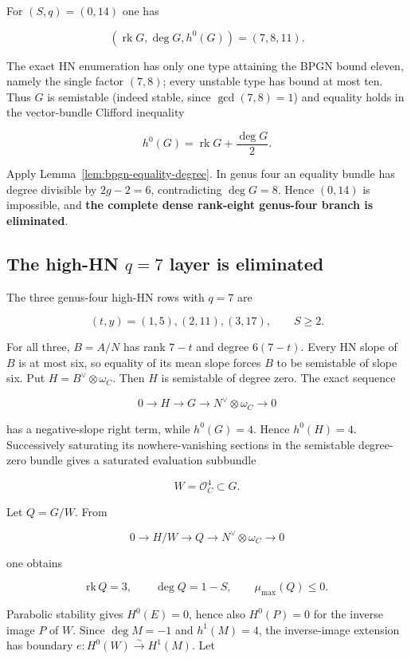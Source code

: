 \documentclass[11pt]{article}
\theoremstyle{definition}
\begin{document}
For \((S,q)=(0,14)\) one has

\[(\operatorname{rk}G,\deg G,h^0(G))=(7,8,11).\]

The exact HN enumeration has only one type attaining the BPGN bound
eleven, namely the single factor \((7,8)\); every unstable type has
bound at most ten. Thus \(G\) is semistable (indeed stable, since
\(\gcd(7,8)=1\)) and equality holds in the vector-bundle Clifford
inequality

\[h^0(G)=\operatorname{rk}G+\frac{\deg G}{2}.\]

Apply Lemma~\ref{lem:bpgn-equality-degree}.  In genus four an equality bundle
has degree divisible by \(2g-2=6\), contradicting \(\deg G=8\). Hence
\((0,14)\) is impossible, and \textbf{the complete dense rank-eight
genus-four branch is eliminated}.

\subsection{\texorpdfstring{The high-HN \(q=7\) layer is
eliminated}{The high-HN q=7 layer is eliminated}}\label{the-high-hn-q7-layer-is-eliminated}

The three genus-four high-HN rows with \(q=7\) are

\[(t,y)=(1,5),(2,11),(3,17),\qquad S\ge2.\]

For all three, \(B=A/N\) has rank \(7-t\) and degree \(6(7-t)\). Every
HN slope of \(B\) is at most six, so equality of its mean slope forces
\(B\) to be semistable of slope six. Put \(H=B^\vee\otimes\omega_C\).
Then \(H\) is semistable of degree zero. The exact sequence

\[0\longrightarrow H\longrightarrow G
\longrightarrow N^\vee\otimes\omega_C\longrightarrow0\]

has a negative-slope right term, while \(h^0(G)=4\). Hence \(h^0(H)=4\).
Successively saturating its nowhere-vanishing sections in the semistable
degree-zero bundle gives a saturated evaluation subbundle

\[W=\mathcal O_C^4\subset G.\]

Let \(Q=G/W\). From

\[0\longrightarrow H/W\longrightarrow Q
\longrightarrow N^\vee\otimes\omega_C\longrightarrow0\]

one obtains

\[\mathrm{rk}\,Q=3,\qquad \deg Q=1-S,
\qquad \mu_{\max}(Q)\le0.\]

Parabolic stability gives \(H^0(E)=0\), hence also \(H^0(P)=0\) for the
inverse image \(P\) of \(W\). Since \(\deg M=-1\) and \(h^1(M)=4\), the
inverse-image extension has boundary
\(e:H^0(W)\xrightarrow{\sim}H^1(M)\). Let
\end{document}
